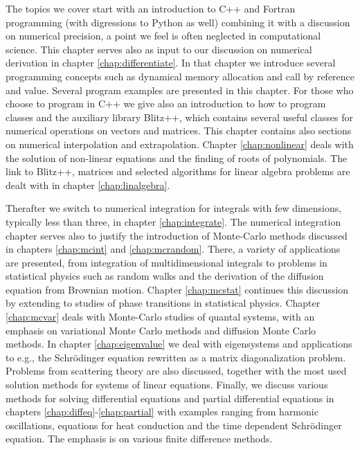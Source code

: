 The topics we cover start with an introduction to C++ and Fortran 
programming (with digressions to Python as well) 
combining it with a  discussion on numerical precision,
a point we feel is often neglected in computational science. 
This chapter serves also as input to our discussion on numerical
derivation in chapter \ref{chap:differentiate}. In that chapter we introduce
several programming concepts such as dynamical memory allocation and call
by reference and value. Several program examples are presented in this chapter.
For those who choose to program in C++ we give also an introduction to how to program classes and 
the auxiliary library Blitz++, which contains several useful classes for 
numerical operations on vectors and matrices. This chapter contains also sections on
numerical interpolation and extrapolation.
Chapter \ref{chap:nonlinear} deals with 
the solution of non-linear equations and the finding of roots of polynomials.
The link to Blitz++, matrices and selected 
algorithms for linear algebra problems are dealt with in 
chapter \ref{chap:linalgebra}. 

Therafter we switch  to
numerical integration for integrals with few dimensions, typically
less than three, in chapter \ref{chap:integrate}. The 
numerical integration
chapter serves also to justify the introduction of Monte-Carlo
methods discussed in chapters \ref{chap:mcint} and \ref{chap:mcrandom}. There, a 
variety of
applications are presented, from integration of multidimensional integrals to
problems in statistical physics such as random walks 
and the derivation of the diffusion equation
from Brownian motion. Chapter \ref{chap:mcstat} continues this discussion by extending
to studies of phase transitions in statistical physics. Chapter \ref{chap:mcvar}
deals with Monte-Carlo studies of quantal systems, with an emphasis 
on variational Monte Carlo
methods and diffusion Monte Carlo methods.
In chapter \ref{chap:eigenvalue} we deal with eigensystems and 
applications
to e.g., the Schr\"odinger equation 
rewritten as a matrix diagonalization problem. Problems from scattering
theory are also discussed, together with the most used solution methods  
for systems
of linear equations.
Finally, we discuss various
methods for solving differential equations and partial differential equations in
chapters \ref{chap:diffeq}-\ref{chap:partial} with examples ranging from harmonic
oscillations, equations for heat conduction and the time dependent
Schr\"odinger equation. The emphasis is on various finite difference
methods. 


